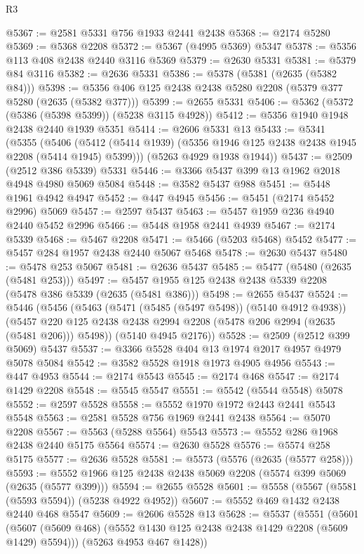 \begin{lexlean}{R3}
\begin{coremodule}
@5367 := @2581 @5331 @756 @1933 @2441 @2438
@5368 := @2174 @5280
@5369 := @5368 @2208
@5372 := @5367 (@4995 @5369) @5347
@5378 := @5356 @113 @408 @2438 @2440 @3116 @5369
@5379 := @2630 @5331
@5381 := @5379 @84 @3116
@5382 := @2636 @5331
@5386 := @5378 (@5381 (@2635 (@5382 @84)))
@5398 := @5356 @406 @125 @2438 @2438 @5280 @2208 (@5379 @377 @5280 (@2635 (@5382 @377)))
@5399 := @2655 @5331
@5406 := @5362 (@5372 (@5386 (@5398 @5399)) (@5238 @3115 @4928))
@5412 := @5356 @1940 @1948 @2438 @2440 @1939 @5351
@5414 := @2606 @5331 @13
@5433 := @5341
    (@5355
      (@5406 (@5412 (@5414 @1939) (@5356 @1946 @125 @2438 @2438 @1945 @2208 (@5414 @1945) @5399)))
      (@5263 @4929 @1938 @1944))
@5437 := @2509 (@2512 @386 @5339) @5331
@5446 := @3366 @5437 @399 @13 @1962 @2018 @4948 @4980 @5069 @5084
@5448 := @3582 @5437 @988
@5451 := @5448 @1961 @4942 @4947
@5452 := @447 @4945
@5456 := @5451 (@2174 @5452 @2996) @5069
@5457 := @2597 @5437
@5463 := @5457 @1959 @236 @4940 @2440 @5452 @2996
@5466 := @5448 @1958 @2441 @4939
@5467 := @2174 @5339
@5468 := @5467 @2208
@5471 := @5466 (@5203 @5468) @5452
@5477 := @5457 @284 @1957 @2438 @2440 @5067 @5468
@5478 := @2630 @5437
@5480 := @5478 @253 @5067
@5481 := @2636 @5437
@5485 := @5477 (@5480 (@2635 (@5481 @253)))
@5497 := @5457 @1955 @125 @2438 @2438 @5339 @2208 (@5478 @386 @5339 (@2635 (@5481 @386)))
@5498 := @2655 @5437
@5524 := @5446
    (@5456
      (@5463
        (@5471 (@5485 (@5497 @5498)) (@5140 @4912 @4938))
        (@5457 @220 @125 @2438 @2438 @2994 @2208 (@5478 @206 @2994 (@2635 (@5481 @206))) @5498))
      (@5140 @4945 @2176))
@5528 := @2509 (@2512 @399 @5069) @5437
@5537 := @3366 @5528 @404 @13 @1974 @2017 @4957 @4979 @5078 @5084
@5542 := @3582 @5528 @1918 @1973 @4905 @4956
@5543 := @447 @4953
@5544 := @2174 @5543
@5545 := @2174 @468
@5547 := @2174 @1429 @2208
@5548 := @5545 @5547
@5551 := @5542 (@5544 @5548) @5078
@5552 := @2597 @5528
@5558 := @5552 @1970 @1972 @2443 @2441 @5543 @5548
@5563 := @2581 @5528 @756 @1969 @2441 @2438
@5564 := @5070 @2208
@5567 := @5563 (@5288 @5564) @5543
@5573 := @5552 @286 @1968 @2438 @2440 @5175 @5564
@5574 := @2630 @5528
@5576 := @5574 @258 @5175
@5577 := @2636 @5528
@5581 := @5573 (@5576 (@2635 (@5577 @258)))
@5593 := @5552 @1966 @125 @2438 @2438 @5069 @2208 (@5574 @399 @5069 (@2635 (@5577 @399)))
@5594 := @2655 @5528
@5601 := @5558 (@5567 (@5581 (@5593 @5594)) (@5238 @4922 @4952))
@5607 := @5552 @469 @1432 @2438 @2440 @468 @5547
@5609 := @2606 @5528 @13
@5628 := @5537
    (@5551
      (@5601 (@5607 (@5609 @468) (@5552 @1430 @125 @2438 @2438 @1429 @2208 (@5609 @1429) @5594)))
      (@5263 @4953 @467 @1428))

\end{coremodule}
\end{lexlean}
